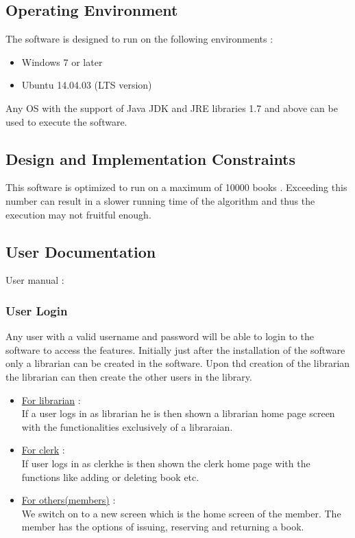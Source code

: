 \documentclass{article}
\begin{document}
\subsection{Operating Environment}
The software is designed to run on the following environments :
\begin{itemize}
\item Windows 7 or later
\item Ubuntu 14.04.03 (LTS version)
\end{itemize}

Any OS with the support of Java JDK and JRE libraries 1.7 and above can be used to execute the software.\\


\subsection{Design and Implementation Constraints}
This software is optimized to run on a maximum of 10000 books .
Exceeding this number can result in a slower running time of the algorithm and thus the execution may not fruitful enough.
\newpage
\subsection{User Documentation}
User manual :

\subsubsection*{User Login}
Any user with a valid username and password will be able to login to the software to access the features. Initially just after the installation of the software only a librarian can be created in the software. Upon thd creation of the librarian the librarian can then create the other users in the library.
\begin{itemize}
\item \underline{For librarian} :\\ If a user logs in as librarian he is then shown a librarian home page screen with the functionalities exclusively of a libraraian.
\item \underline{For clerk} :\\ If user logs in as clerkhe is then shown the clerk home page with the functions like adding or deleting book etc.
\item \underline{For others(members)} : \\We switch on to a new screen which is the home screen of the member. The member has the options of issuing, reserving and returning a book.
\end{itemize}
\end{document}
